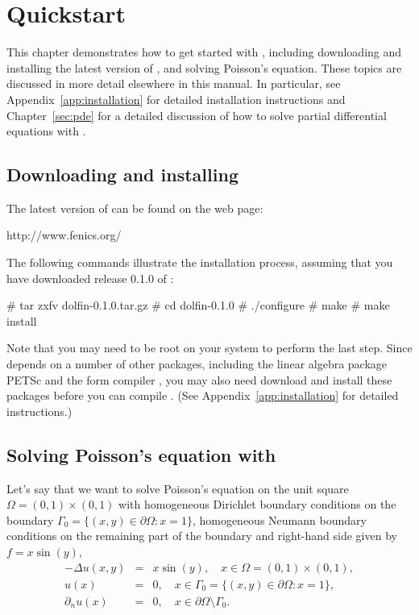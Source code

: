 \chapter{Quickstart}
\label{chap:quickstart}

This chapter demonstrates how to get started with \dolfin{}, including
downloading and installing the latest version of \dolfin{}, and solving
Poisson's equation. These topics are discussed in more detail
elsewhere in this manual. In particular, see
Appendix~\ref{app:installation} for detailed installation instructions
and Chapter~\ref{sec:pde} for a detailed discussion of how to solve
partial differential equations with \dolfin{}.

\section{Downloading and installing \dolfin{}}

The latest version of \dolfin{} can be found on the \fenics{} web page:
\begin{code}
  http://www.fenics.org/
\end{code}
The following commands illustrate the installation process, assuming
that you have downloaded release 0.1.0 of \dolfin{}:
\begin{code}
  # tar zxfv dolfin-0.1.0.tar.gz
  # cd dolfin-0.1.0
  # ./configure
  # make
  # make install
\end{code}

Note that you may need to be root on your system to perform the last
step. Since \dolfin{} depends on a number of other packages, including
the linear algebra package PETSc and the form compiler \ffc{}, you may also need
download and install these packages before you can compile \dolfin{}.
(See Appendix~\ref{app:installation} for detailed instructions.)

\section{Solving Poisson's equation with \dolfin{}}

Let's say that we want to solve Poisson's equation on the unit square
$\Omega = (0,1) \times (0,1)$ with homogeneous Dirichlet boundary
conditions on the boundary $\Gamma_0 = \{(x, y) \in \partial \Omega : x = 1\}$,
homogeneous Neumann boundary conditions on the remaining part of the boundary
and right-hand side given by $f = x \sin(y)$,
\begin{eqnarray} \label{eq:poisson,quickstart}
  - \Delta u(x, y) &=& x \sin(y), \quad
  x \in \Omega = (0,1) \times (0,1), \\
  u(x) &=& 0, \quad
  x \in \Gamma_0 = \{(x, y) \in \partial \Omega : x = 1\}, \\
  \partial_n u(x) &=& 0, \quad
  x \in \partial \Omega \setminus \Gamma_0.
\end{eqnarray}

